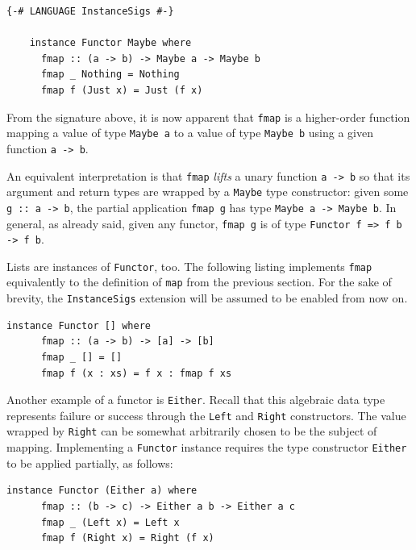 \documentclass[UdineBachThesis,american,11pt]{PhdThesis}
\begin{document}
  \begin{Verbatim}[gobble=4,fontsize=\small]
    {-# LANGUAGE InstanceSigs #-}

    instance Functor Maybe where
      fmap :: (a -> b) -> Maybe a -> Maybe b
      fmap _ Nothing = Nothing
      fmap f (Just x) = Just (f x)
  \end{Verbatim}

  From the signature above, it is now apparent that \mbox{\texttt{fmap}} is a
  higher-order function mapping a value of type \mbox{\texttt{Maybe a}} to a
  value of type \mbox{\texttt{Maybe b}} using a given function
  \mbox{\texttt{a -> b}}.

  An equivalent interpretation is that \mbox{\texttt{fmap}} \emph{lifts} a unary
  function \mbox{\texttt{a -> b}} so that its argument and return types are
  wrapped by a \mbox{\texttt{Maybe}} type constructor: given some
  \mbox{\texttt{g :: a -> b}}, the partial application \mbox{\texttt{fmap g}}
  has type \mbox{\texttt{Maybe a -> Maybe b}}. In general, as already said,
  given any functor, \mbox{\texttt{fmap g}} is of type
  \mbox{\texttt{Functor f => f b -> f b}}.

  Lists are instances of \mbox{\texttt{Functor}}, too. The following listing
  implements \mbox{\texttt{fmap}} equivalently to the definition of
  \mbox{\texttt{map}} from the previous section. For the sake of brevity, the
  \mbox{\texttt{InstanceSigs}} extension will be assumed to be enabled from now
  on.

  \begin{Verbatim}[gobble=4,fontsize=\small]
    instance Functor [] where
      fmap :: (a -> b) -> [a] -> [b]
      fmap _ [] = []
      fmap f (x : xs) = f x : fmap f xs
  \end{Verbatim}

  Another example of a functor is \mbox{\texttt{Either}}. Recall that this
  algebraic data type represents failure or success through the
  \mbox{\texttt{Left}} and \mbox{\texttt{Right}} constructors. The value wrapped
  by \mbox{\texttt{Right}} can be somewhat arbitrarily chosen to be the subject
  of mapping. Implementing a \mbox{\texttt{Functor}} instance requires the type
  constructor \mbox{\texttt{Either}} to be applied partially, as follows:

  \begin{Verbatim}[gobble=4,fontsize=\small]
    instance Functor (Either a) where
      fmap :: (b -> c) -> Either a b -> Either a c
      fmap _ (Left x) = Left x
      fmap f (Right x) = Right (f x)
  \end{Verbatim}
\end{document}
